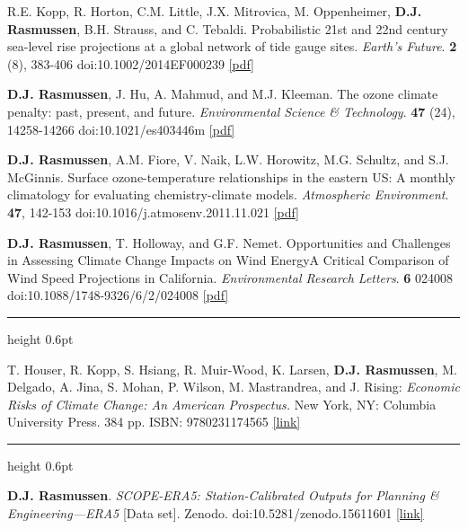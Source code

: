 \documentclass[10.5pt]{article}
\newcommand{\cvsection}[1]{%
  \par\addvspace{12pt}\pagebreak[3]%
  {\sffamily\bfseries\small\textls[80]{\MakeUppercase{#1}}}%
  \par\vspace{2pt}%
  {\color{rulegray}\hrule height 0.6pt}%
  \vspace{5pt}\nopagebreak}
\renewcommand{\section}[1]{\cvsection{#1}}
\newcommand{\yr}[1]{{\sffamily\bfseries #1}}
\begin{document}
\begin{entries}
\item[\yr{2014}] R.E. Kopp, R. Horton, C.M. Little, J.X. Mitrovica, M. Oppenheimer, \textbf{D.J. Rasmussen}, B.H. Strauss, and C. Tebaldi. Probabilistic 21st and 22nd century sea-level rise projections at a global network of tide gauge sites. \emph{Earth's Future}. \textbf{2} (8), 383-406 doi:10.1002/2014EF000239 \href{https://www.dropbox.com/s/pebs0c3xf9adl4x/rasmussenetal_2012.pdf?dl=0}{[pdf]}
\item[\yr{2013}] \textbf{D.J. Rasmussen}, J. Hu, A. Mahmud, and M.J. Kleeman. The ozone climate penalty: past, present, and future. \emph{Environmental Science \& Technology}. \textbf{47} (24), 14258-14266 doi:10.1021/es403446m \href{https://www.dropbox.com/s/8zu597npl927ymt/es403446m_proof.pdf?dl=0}{[pdf]}
\item[\yr{2012}] \textbf{D.J. Rasmussen}, A.M. Fiore, V. Naik, L.W. Horowitz, M.G. Schultz, and S.J. McGinnis. Surface ozone-temperature relationships in the eastern US: A monthly climatology for evaluating chemistry-climate models. \emph{Atmospheric Environment}. \textbf{47}, 142-153 doi:10.1016/j.atmosenv.2011.11.021 \href{https://www.dropbox.com/s/pebs0c3xf9adl4x/rasmussenetal_2012.pdf?dl=0}{[pdf]}
\item[\yr{2011}] \textbf{D.J. Rasmussen}, T. Holloway, and G.F. Nemet. Opportunities and Challenges in Assessing Climate Change Impacts on Wind Energy\textemdash A Critical Comparison of Wind Speed Projections in California. \emph{Environmental Research Letters}. \textbf{6} 024008 doi:10.1088/1748-9326/6/2/024008 \href{https://iopscience.iop.org/article/10.1088/1748-9326/6/2/024008/pdf}{[pdf]}
\end{entries}

\section{Books}
\begin{entries}
\item[\yr{2015}] T. Houser, R. Kopp, S. Hsiang, R. Muir-Wood, K. Larsen, \textbf{D.J. Rasmussen}, M. Delgado, A. Jina, S. Mohan, P. Wilson, M. Mastrandrea, and J. Rising: \emph{Economic Risks of Climate Change: An American Prospectus.} New York, NY: Columbia University Press. 384 pp. ISBN: 9780231174565 \href{https://www.amazon.com/Economic-Risks-Climate-Change-Prospectus/dp/023117456X}{[link]}
\end{entries}

\section{Software \& Data Products}
\begin{entries}
\item[\yr{2026}] \textbf{D.J. Rasmussen}. \emph{SCOPE-ERA5: Station-Calibrated Outputs for Planning \& Engineering---ERA5} [Data set]. Zenodo. doi:10.5281/zenodo.15611601 \href{https://doi.org/10.5281/zenodo.15611601}{[link]}
\end{entries}
\end{document}
